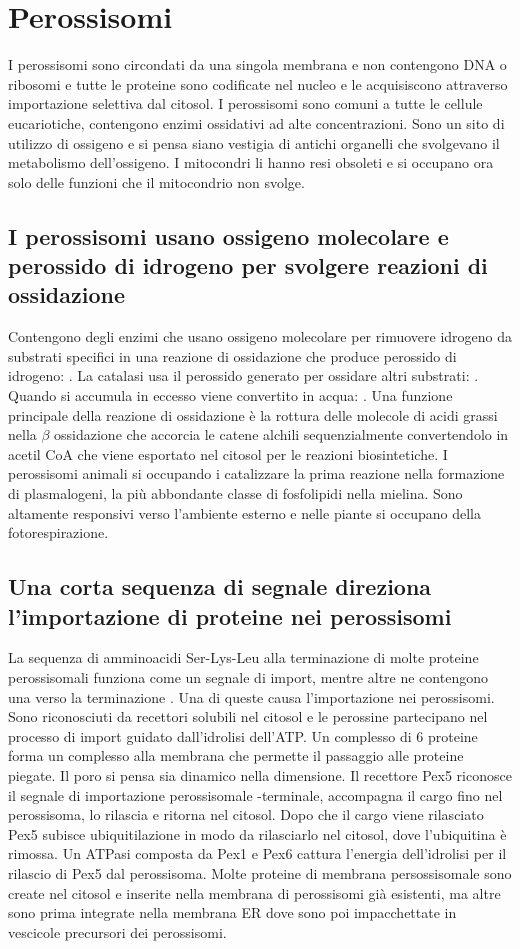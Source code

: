 \section{Perossisomi}
I perossisomi sono circondati da una singola membrana e non contengono DNA o ribosomi e tutte le proteine sono codificate nel nucleo e le acquisiscono attraverso importazione selettiva
dal citosol. I perossisomi sono comuni a tutte le cellule eucariotiche, contengono enzimi ossidativi ad alte concentrazioni. Sono un sito di utilizzo di ossigeno e si pensa siano
vestigia di antichi organelli che svolgevano il metabolismo dell'ossigeno. I mitocondri li hanno resi obsoleti e si occupano ora solo delle funzioni che il mitocondrio non svolge.
\subsection{I perossisomi usano ossigeno molecolare e perossido di idrogeno per svolgere reazioni di ossidazione}
Contengono degli enzimi che usano ossigeno molecolare per rimuovere idrogeno da substrati specifici in una reazione di ossidazione che produce perossido di idrogeno: . La catalasi usa il perossido generato per ossidare altri substrati: . Quando  si accumula in eccesso viene convertito in acqua:
. Una funzione principale della reazione di ossidazione \`e la rottura delle molecole di acidi grassi nella $\beta$ ossidazione che accorcia le catene alchili
sequenzialmente convertendolo in acetil CoA che viene esportato nel citosol per le reazioni biosintetiche. I perossisomi animali si occupando i catalizzare la prima reazione nella 
formazione di plasmalogeni, la pi\`u abbondante classe di fosfolipidi nella mielina. Sono altamente responsivi verso l'ambiente esterno e nelle piante si occupano della 
fotorespirazione. 
\subsection{Una corta sequenza di segnale direziona l'importazione di proteine nei perossisomi}
La sequenza di amminoacidi Ser-Lys-Leu alla terminazione  di molte proteine perossisomali funziona come un segnale di import, mentre altre ne contengono una verso la terminazione
. Una di queste causa l'importazione nei perossisomi. Sono riconosciuti da recettori solubili nel citosol e le perossine partecipano nel processo di import guidato dall'idrolisi
dell'ATP. Un complesso di $6$ proteine forma un complesso alla membrana che permette il passaggio alle proteine piegate. Il poro si pensa sia dinamico nella dimensione. Il recettore 
Pex5 riconosce il segnale di importazione perossisomale -terminale, accompagna il cargo fino nel perossisoma, lo rilascia e ritorna nel citosol. Dopo che il cargo viene rilasciato
Pex5 subisce ubiquitilazione in modo da rilasciarlo nel citosol, dove l'ubiquitina \`e rimossa. Un ATPasi composta da Pex1 e Pex6 cattura l'energia dell'idrolisi per il rilascio di Pex5
dal perossisoma. Molte proteine di membrana persossisomale sono create nel citosol e inserite nella membrana di perossisomi gi\`a esistenti, ma altre sono prima integrate nella membrana
ER dove sono poi impacchettate in vescicole precursori dei perossisomi. 
